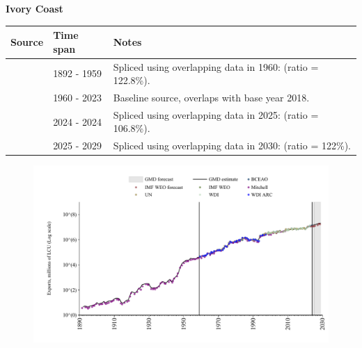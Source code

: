 \documentclass[12pt,a4paper,landscape]{article}
\begin{document}
\begin{adjustbox}{max totalsize={\paperwidth}{\paperheight},center}
\begin{minipage}[t][\textheight][t]{\textwidth}
\vspace*{0.5cm}
{}
\begin{center}
{\Large\bfseries Ivory Coast}
\end{center}
\vspace{0.5cm}
\begin{table}[H]
\centering
\small
\begin{tabular}{|l|l|l|}
\hline
\textbf{Source} & \textbf{Time span} & \textbf{Notes} \\
\hline
\rowcolor{white}\cite{Mitchell}& 1892 - 1959 &Spliced using overlapping data in 1960: (ratio = 122.8\%).\\
\rowcolor{lightgray}\cite{WDI}& 1960 - 2023 &Baseline source, overlaps with base year 2018.\\
\rowcolor{white}\cite{BCEAO}& 2024 - 2024 &Spliced using overlapping data in 2025: (ratio = 106.8\%).\\
\rowcolor{lightgray}\cite{IMF_WEO_forecast}& 2025 - 2029 &Spliced using overlapping data in 2030: (ratio = 122\%).\\
\hline
\end{tabular}
\end{table}
\begin{figure}[H]
\centering
\includegraphics[width=\textwidth,height=0.6\textheight,keepaspectratio]{graphs/CIV_exports.pdf}
\end{figure}
\end{minipage}
\end{adjustbox}
\end{document}
